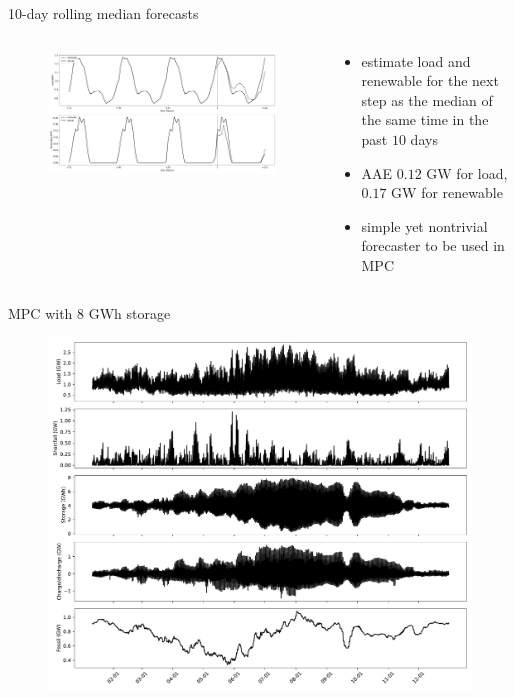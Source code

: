 \documentclass[aspectratio=169,11pt]{beamer}
\begin{document}
\begin{frame}{10-day rolling median forecasts} 
    \begin{columns}
        \begin{column}{0.6\textwidth}
            \begin{figure}
                \centering
                \includegraphics[width=\columnwidth]{./figures/simple_forecasts.pdf}
            \end{figure}
        \end{column}
        \begin{column}{0.4\textwidth}
            \begin{itemize}
                \item estimate load and renewable for the next step
                as the median of the same time in the past $10$ days
                \item AAE $0.12$ GW for load, $0.17$ GW for renewable
                \item simple yet nontrivial forecaster to be used in MPC
            \end{itemize}
        \end{column}
    \end{columns}
\end{frame}

\begin{frame}{MPC with $8$ GWh storage}
\begin{figure}
    \centering
    \includegraphics[width=0.7\columnwidth]{./figures/mpc_hourly_profiles.pdf}
\end{figure}
\end{frame}
\end{document}

